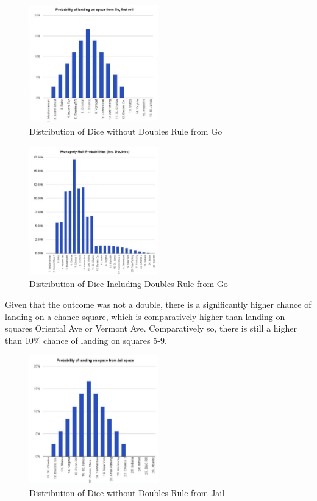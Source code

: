 \documentclass[12pt]{article}
\begin{document}
\begin{figure}[h]
\centering
\includegraphics[width=0.5\textwidth]{non_doubles_go.png}
\caption{Distribution of Dice without Doubles Rule from Go}
\end{figure}

\begin{figure}[h]
\centering
\includegraphics[width=0.5\textwidth]{incl_doubles_go.png}
\caption{Distribution of Dice Including Doubles Rule from Go}
\end{figure}

Given that the outcome was not a double, there is a significantly higher chance of landing on a chance square, which is comparatively higher than landing on squares Oriental Ave or Vermont Ave. Comparatively so, there is still a higher than 10\% chance of landing on squares 5-9.

\begin{figure}[h]
\centering
\includegraphics[width=0.5\textwidth]{non_doubles_jail.png}
\caption{Distribution of Dice without Doubles Rule from Jail}
\end{figure}
\end{document}
